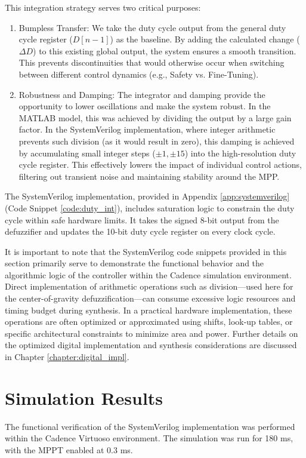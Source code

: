 \documentclass[a4paper,oneside,12pt]{report}
\numberwithin{equation}{chapter}
\begin{document}
This integration strategy serves two critical purposes:
\begin{enumerate}
    \item Bumpless Transfer: We take the duty cycle output from the general duty cycle register ($D[n-1]$) as the baseline. By adding the calculated change ($\Delta D$) to this existing global output, the system ensures a smooth transition. This prevents discontinuities that would otherwise occur when switching between different control dynamics (e.g., Safety vs. Fine-Tuning).
    \item Robustness and Damping: The integrator and damping provide the opportunity to lower oscillations and make the system robust. In the MATLAB model, this was achieved by dividing the output by a large gain factor. In the SystemVerilog implementation, where integer arithmetic prevents such division (as it would result in zero), this damping is achieved by accumulating small integer steps ($\pm 1, \pm 15$) into the high-resolution duty cycle register. This effectively lowers the impact of individual control actions, filtering out transient noise and maintaining stability around the MPP.
\end{enumerate}

The SystemVerilog implementation, provided in Appendix \ref{app:systemverilog} (Code Snippet \ref{code:duty_int}), includes saturation logic to constrain the duty cycle within safe hardware limits. It takes the signed 8-bit output from the defuzzifier and updates the 10-bit duty cycle register on every clock cycle.

It is important to note that the SystemVerilog code snippets provided in this section primarily serve to demonstrate the functional behavior and the algorithmic logic of the controller within the Cadence simulation environment. Direct implementation of arithmetic operations such as division---used here for the center-of-gravity defuzzification---can consume excessive logic resources and timing budget during synthesis. In a practical hardware implementation, these operations are often optimized or approximated using shifts, look-up tables, or specific architectural constraints to minimize area and power. Further details on the optimized digital implementation and synthesis considerations are discussed in Chapter \ref{chapter:digital_impl}.

\section{Simulation Results}\label{sec:sv_simulation_results}
The functional verification of the SystemVerilog implementation was performed within the Cadence Virtuoso environment. The simulation was run for 180 ms, with the MPPT enabled at 0.3 ms.
\end{document}
